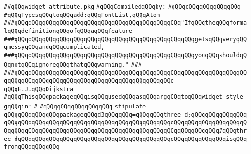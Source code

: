 \label{src/lib/x-kit/widget/lib/widget-attribute.pkg}
\verb|##qQQqwidget-attribute.pkg|\newline
\newline
\verb|#qQQqCompiledqQQqby:|\newline
\verb|#qQQqqQQqqQQqqQQqqQQq|\newline
\newline
\newline
\newline
\verb|#qQQqTypesqQQqtoqQQqadd:qQQqFontList,qQQqAtom|\newline
\newline
\newline
\newline
\verb|###qQQqqQQqqQQqqQQqqQQqqQQqqQQqqQQqqQQqqQQqqQQqqQQq"IfqQQqtheqQQqformalqQQqdefinitionqQQqofqQQqaqQQqfeature|\newline
\verb|###qQQqqQQqqQQqqQQqqQQqqQQqqQQqqQQqqQQqqQQqqQQqqQQqqQQqgetsqQQqveryqQQqmessyqQQqandqQQqcomplicated,|\newline
\verb|###qQQqqQQqqQQqqQQqqQQqqQQqqQQqqQQqqQQqqQQqqQQqqQQqqQQqyouqQQqshouldqQQqnotqQQqignoreqQQqthatqQQqwarning."|\newline
\verb|###|\newline
\verb|###qQQqqQQqqQQqqQQqqQQqqQQqqQQqqQQqqQQqqQQqqQQqqQQqqQQqqQQqqQQqqQQqqQQqqQQqqQQqqQQqqQQqqQQqqQQqqQQqqQQqqQQqqQQqqQQqqQQq--qQQqE.J.qQQqDijkstra|\newline
\newline
\newline
\newline
\verb|#qQQqThisqQQqpackageqQQqisqQQqusedqQQqasqQQqargqQQqtoqQQqwidget_style_gqQQqin:|\newline
\verb|#|\newline
\verb|#qQQqqQQqqQQqqQQqqQQq|\newline
\newline
\verb|stipulate|\newline
\verb|qQQqqQQqqQQqqQQqpackageqQQqd3qQQqqQQq=qQQqqQQqthree_d;qQQqqQQqqQQqqQQqqQQqqQQqqQQqqQQqqQQqqQQqqQQqqQQqqQQqqQQqqQQqqQQqqQQqqQQqqQQqqQQqqQQqqQQqqQQqqQQqqQQqqQQqqQQqqQQqqQQqqQQqqQQqqQQqqQQqqQQqqQQqqQQqqQQq#qQQqthree_dqQQqqQQqqQQqqQQqqQQqqQQqqQQqqQQqqQQqqQQqqQQqqQQqqQQqqQQqqQQqisqQQqfromqQQqqQQqqQQq|\newline
